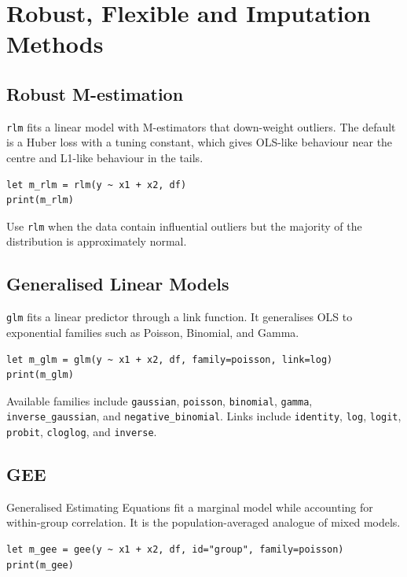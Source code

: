 \chapter{Robust, Flexible and Imputation Methods}

\section{Robust M-estimation}

\texttt{rlm} fits a linear model with M-estimators that down-weight outliers.
The default is a Huber loss with a tuning constant, which gives OLS-like
behaviour near the centre and L1-like behaviour in the tails.

\begin{lstlisting}[caption={Robust regression}]
let m_rlm = rlm(y ~ x1 + x2, df)
print(m_rlm)
\end{lstlisting}

Use \texttt{rlm} when the data contain influential outliers but the majority of
the distribution is approximately normal.

\section{Generalised Linear Models}

\texttt{glm} fits a linear predictor through a link function. It generalises
OLS to exponential families such as Poisson, Binomial, and Gamma.

\begin{lstlisting}[caption={GLM}]
let m_glm = glm(y ~ x1 + x2, df, family=poisson, link=log)
print(m_glm)
\end{lstlisting}

Available families include \texttt{gaussian}, \texttt{poisson}, \texttt{binomial}, \texttt{gamma},
\texttt{inverse\_gaussian}, and \texttt{negative\_binomial}. Links include \texttt{identity},
\texttt{log}, \texttt{logit}, \texttt{probit}, \texttt{cloglog}, and \texttt{inverse}.

\section{GEE}

Generalised Estimating Equations fit a marginal model while accounting
for within-group correlation. It is the population-averaged analogue of
mixed models.

\begin{lstlisting}[caption={GEE}]
let m_gee = gee(y ~ x1 + x2, df, id="group", family=poisson)
print(m_gee)
\end{lstlisting}

